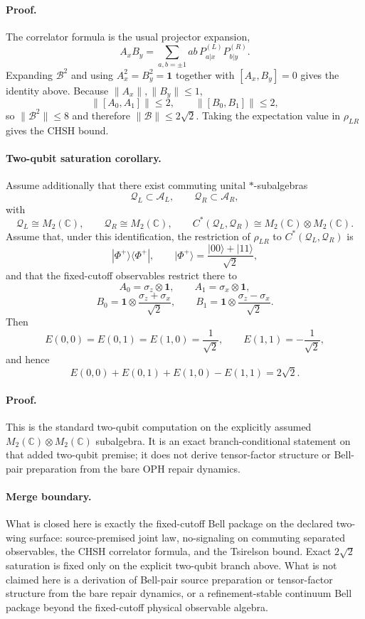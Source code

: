 \documentclass[11pt]{article}
\begin{document}
\paragraph{Proof.}
The correlator formula is the usual projector expansion,
\[
A_xB_y
=
\sum_{a,b=\pm1}ab\,P_{a|x}^{(L)}P_{b|y}^{(R)}.
\]
Expanding \(\mathcal B^2\) and using \(A_x^2=B_y^2=\mathbf 1\) together with
\([A_x,B_y]=0\) gives the identity above. Because \(\|A_x\|,\|B_y\|\le 1\),
\[
\|[A_0,A_1]\|\le 2,
\qquad
\|[B_0,B_1]\|\le 2,
\]
so \(\|\mathcal B^2\|\le 8\) and therefore \(\|\mathcal B\|\le 2\sqrt2\). Taking the expectation
value in \(\rho_{LR}\) gives the CHSH bound.

\paragraph{Two-qubit saturation corollary.}
Assume additionally that there exist commuting unital \(*\)-subalgebras
\[
\mathcal Q_L\subset \mathcal A_L,
\qquad
\mathcal Q_R\subset \mathcal A_R,
\]
with
\[
\mathcal Q_L\cong M_2(\mathbb C),
\qquad
\mathcal Q_R\cong M_2(\mathbb C),
\qquad
C^*(\mathcal Q_L,\mathcal Q_R)\cong M_2(\mathbb C)\otimes M_2(\mathbb C).
\]
Assume that, under this identification, the restriction of \(\rho_{LR}\) to
\(C^*(\mathcal Q_L,\mathcal Q_R)\) is
\[
|\Phi^+\rangle\!\langle\Phi^+|,
\qquad
|\Phi^+\rangle=\frac{|00\rangle+|11\rangle}{\sqrt2},
\]
and that the fixed-cutoff observables restrict there to
\[
A_0=\sigma_z\otimes \mathbf 1,
\qquad
A_1=\sigma_x\otimes \mathbf 1,
\]
\[
B_0=\mathbf 1\otimes \frac{\sigma_z+\sigma_x}{\sqrt2},
\qquad
B_1=\mathbf 1\otimes \frac{\sigma_z-\sigma_x}{\sqrt2}.
\]
Then
\[
E(0,0)=E(0,1)=E(1,0)=\frac{1}{\sqrt2},
\qquad
E(1,1)=-\frac{1}{\sqrt2},
\]
and hence
\[
E(0,0)+E(0,1)+E(1,0)-E(1,1)=2\sqrt2.
\]

\paragraph{Proof.}
This is the standard two-qubit computation on the explicitly assumed
\(M_2(\mathbb C)\otimes M_2(\mathbb C)\) subalgebra. It is an exact branch-conditional statement
on that added two-qubit premise; it does not derive tensor-factor structure or Bell-pair
preparation from the bare OPH repair dynamics.

\paragraph{Merge boundary.}
What is closed here is exactly the fixed-cutoff Bell package on the declared two-wing surface:
source-premised joint law, no-signaling on commuting separated observables, the CHSH correlator
formula, and the Tsirelson bound. Exact \(2\sqrt2\) saturation is fixed only on the explicit
two-qubit branch above. What is not claimed here is a derivation of Bell-pair source preparation
or tensor-factor structure from the bare repair dynamics, or a refinement-stable continuum Bell
package beyond the fixed-cutoff physical observable algebra.
\end{document}
